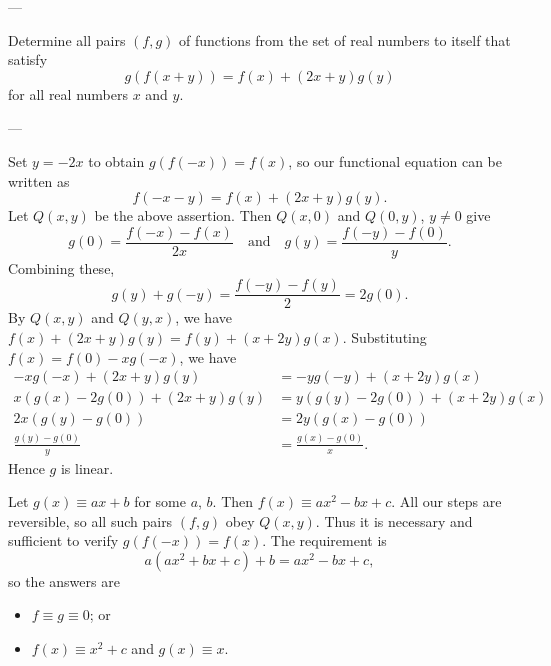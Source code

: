 
---

Determine all pairs $(f,g)$ of functions from the set of real numbers to itself that satisfy \[g(f(x+y))=f(x)+(2x+y)g(y)\]
for all real numbers $x$ and $y$.

---

Set $y=-2x$ to obtain $g(f(-x))=f(x)$, so our functional equation can be written as \[f(-x-y)=f(x)+(2x+y)g(y).\]
Let $Q(x,y)$ be the above assertion. Then $Q(x,0)$ and $Q(0,y)$, $y\ne0$ give \[g(0)=\frac{f(-x)-f(x)}{2x}\quad\text{and}\quad g(y)=\frac{f(-y)-f(0)}y.\]
Combining these, \[g(y)+g(-y)=\frac{f(-y)-f(y)}2=2g(0).\]
By $Q(x,y)$ and $Q(y,x)$, we have $f(x)+(2x+y)g(y)=f(y)+(x+2y)g(x)$.
Substituting $f(x)=f(0)-xg(-x)$, we have
\begin{align*}
    -xg(-x)+(2x+y)g(y)&=-yg(-y)+(x+2y)g(x)\\
    x(g(x)-2g(0))+(2x+y)g(y)&=y(g(y)-2g(0))+(x+2y)g(x)\\
    2x(g(y)-g(0))&=2y(g(x)-g(0))\\
    \frac{g(y)-g(0)}y&=\frac{g(x)-g(0)}x.
\end{align*}
Hence $g$ is linear.

Let $g(x)\equiv ax+b$ for some $a$, $b$. Then $f(x)\equiv ax^2-bx+c$. All our steps are reversible, so all such pairs $(f,g)$ obey $Q(x,y)$. Thus it is necessary and sufficient to verify $g(f(-x))=f(x)$. The requirement is \[a\left(ax^2+bx+c\right)+b=ax^2-bx+c,\]
so the answers are
\begin{itemize}[itemsep=0em]
    \item $f\equiv g\equiv0$; or
    \item $f(x)\equiv x^2+c$ and $g(x)\equiv x$.
\end{itemize}


